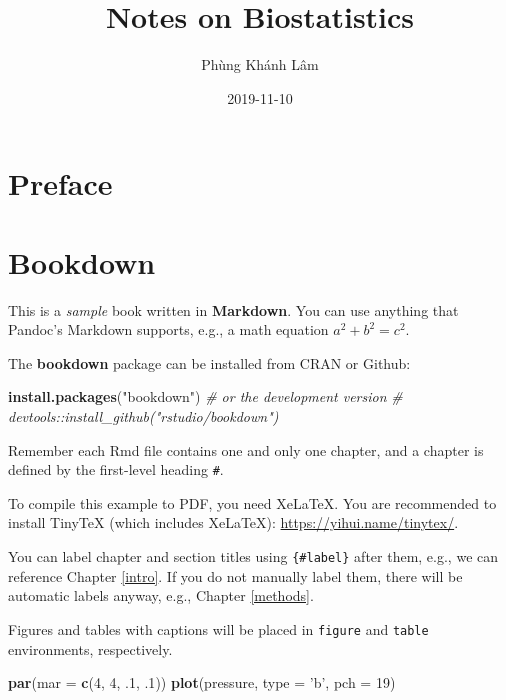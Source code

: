 \documentclass[]{book}
\title{Notes on Biostatistics}
\author{Phùng Khánh Lâm}
\date{2019-11-10}
\newenvironment{Shaded}{\begin{snugshade}}{\end{snugshade}}
\newcommand{\CommentTok}[1]{\textcolor[rgb]{0.56,0.35,0.01}{\textit{#1}}}
\newcommand{\DataTypeTok}[1]{\textcolor[rgb]{0.13,0.29,0.53}{#1}}
\newcommand{\DecValTok}[1]{\textcolor[rgb]{0.00,0.00,0.81}{#1}}
\newcommand{\FloatTok}[1]{\textcolor[rgb]{0.00,0.00,0.81}{#1}}
\newcommand{\KeywordTok}[1]{\textcolor[rgb]{0.13,0.29,0.53}{\textbf{#1}}}
\newcommand{\NormalTok}[1]{#1}
\newcommand{\StringTok}[1]{\textcolor[rgb]{0.31,0.60,0.02}{#1}}
\begin{document}
\maketitle

{
\setcounter{tocdepth}{1}
\tableofcontents
}
\hypertarget{preface}{%
\chapter*{Preface}\label{preface}}

\hypertarget{bookdown}{%
\chapter*{Bookdown}\label{bookdown}}

This is a \emph{sample} book written in \textbf{Markdown}. You can use anything that Pandoc's Markdown supports, e.g., a math equation \(a^2 + b^2 = c^2\).

The \textbf{bookdown} package can be installed from CRAN or Github:

\begin{Shaded}
\begin{Highlighting}[]
\KeywordTok{install.packages}\NormalTok{(}\StringTok{"bookdown"}\NormalTok{)}
\CommentTok{# or the development version}
\CommentTok{# devtools::install_github("rstudio/bookdown")}
\end{Highlighting}
\end{Shaded}

Remember each Rmd file contains one and only one chapter, and a chapter is defined by the first-level heading \texttt{\#}.

To compile this example to PDF, you need XeLaTeX. You are recommended to install TinyTeX (which includes XeLaTeX): \url{https://yihui.name/tinytex/}.

You can label chapter and section titles using \texttt{\{\#label\}} after them, e.g., we can reference Chapter \ref{intro}. If you do not manually label them, there will be automatic labels anyway, e.g., Chapter \ref{methods}.

Figures and tables with captions will be placed in \texttt{figure} and \texttt{table} environments, respectively.

\begin{Shaded}
\begin{Highlighting}[]
\KeywordTok{par}\NormalTok{(}\DataTypeTok{mar =} \KeywordTok{c}\NormalTok{(}\DecValTok{4}\NormalTok{, }\DecValTok{4}\NormalTok{, }\FloatTok{.1}\NormalTok{, }\FloatTok{.1}\NormalTok{))}
\KeywordTok{plot}\NormalTok{(pressure, }\DataTypeTok{type =} \StringTok{'b'}\NormalTok{, }\DataTypeTok{pch =} \DecValTok{19}\NormalTok{)}
\end{Highlighting}
\end{Shaded}
\end{document}
